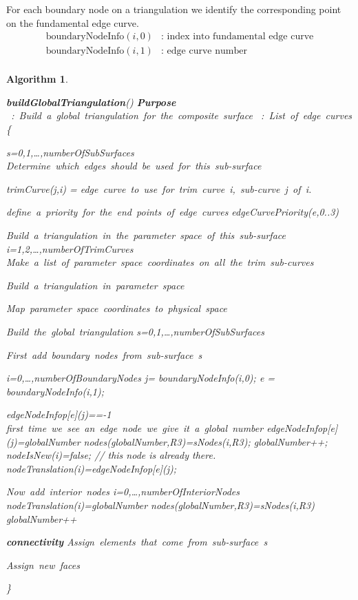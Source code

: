 \documentclass[11pt]{article}
\newtheorem{algorithm}{Algorithm}[section]
\newcommand{\bc}[1]{\mbox{\bf#1}}   %
\newcommand{\cc}[1]{\mbox{  : #1}}  %
\begin{document}
For each boundary node on a triangulation we identify the corresponding point on the fundamental edge curve.
\begin{align*}
   \text{boundaryNodeInfo}(i,0) &\mbox{: index into fundamental edge curve} \\
   \text{boundaryNodeInfo}(i,1) &\mbox{: edge curve number} \\
\end{align*}


\begin{algorithm}
\begin{programbox}
\bc{buildGlobalTriangulation}(\Ev )
\bc{Purpose} \cc{Build a global triangulation for the composite surface}
\Ev \cc{List of edge curves}
\{\qtab

  \FOR s=0,1,\ldots,\mbox{numberOfSubSurfaces}
    \mbox{Determine which edges should be used for this sub-surface}

     trimCurve(j,i) = \mbox{edge curve to use for trim curve i, sub-curve j of i.}

     \mbox{define a priority for the end points of edge curves}
     edgeCurvePriority(e,0..3) 
                                  

     \mbox{Build a triangulation in the parameter space of this sub-surface}
     \FOR i=1,2,\ldots,\mbox{numberOfTrimCurves}
        \mbox{Make a list of parameter space coordinates on all the trim sub-curves}
     \END

     \mbox{Build a triangulation in parameter space}

     \mbox{Map parameter space coordinates to physical space}

  \END

  \mbox{Build the global triangulation}
  \FOR s=0,1,\ldots,\mbox{numberOfSubSurfaces}

    \mbox{First add boundary nodes from sub-surface s}

    \FOR i=0,\ldots,\mbox{numberOfBoundaryNodes}
      j= boundaryNodeInfo(i,0);
      e = boundaryNodeInfo(i,1);

      \IF edgeNodeInfop[e](j)==-1 
        \mbox{first time we see an edge node we give it a global number}
	edgeNodeInfop[e](j)=globalNumber
        nodes(globalNumber,R3)=sNodes(i,R3);
	globalNumber++;
      \ELSE
	nodeIsNew(i)=false; // this node is already there.
      nodeTranslation(i)=edgeNodeInfop[e](j);
    \END

    \mbox{Now add interior nodes}
    \FOR i=0,\ldots,\mbox{numberOfInteriorNodes}
      nodeTranslation(i)=globalNumber
      nodes(globalNumber,R3)=sNodes(i,R3)
      globalNumber++
    \END

    \bc{connectivity}
    \mbox{Assign elements that come from sub-surface s}

    \mbox{Assign new faces}


  \END

\untab
\}
\end{programbox}
\end{algorithm}
\end{document}
